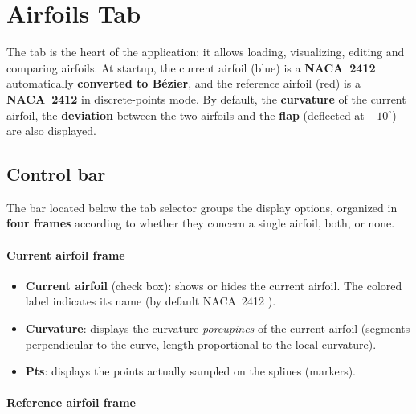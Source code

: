 \chapter{Airfoils Tab}
\label{chap:profils}

The  tab is the heart of the application: it allows
loading, visualizing, editing and comparing airfoils. At startup,
the current airfoil (blue) is a \textbf{NACA~2412} automatically
\textbf{converted to Bézier}, and the reference airfoil (red) is a
\textbf{NACA~2412} in discrete-points mode. By default, the
\textbf{curvature} of the current airfoil, the \textbf{deviation}
between the two airfoils and the \textbf{flap} (deflected at
$-10^\circ$) are also displayed.


\section{Control bar}

The bar located below the tab selector groups the display options,
organized in \textbf{four frames} according to whether they concern
a single airfoil, both, or none.

\subsubsection*{\og Current airfoil \fg{} frame}

\begin{itemize}
    \item \textbf{Current airfoil} (check box): shows or hides the
        current airfoil. The colored label indicates its name (by
        default \og NACA~2412 \fg{}).
    \item \textbf{Curvature}: displays the curvature
        \emph{porcupines} of the current airfoil (segments
        perpendicular to the curve, length proportional to the local
        curvature).
    \item \textbf{Pts}: displays the points actually sampled on the
        splines (markers).
\end{itemize}

\subsubsection*{\og Reference airfoil \fg{} frame}

